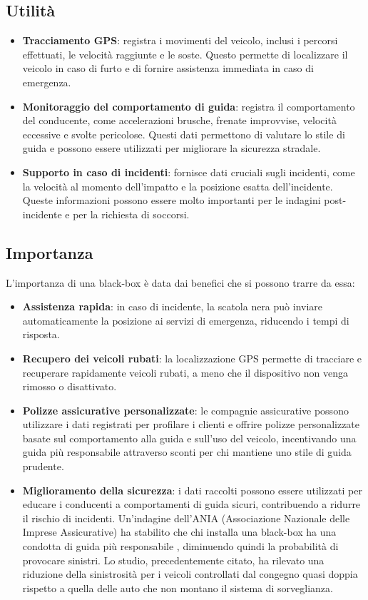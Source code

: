 \documentclass[12pt, a4paper, italian]{report}
\numberwithin{figure}{chapter}
\numberwithin{table}{chapter}
\begin{document}
\subsection{Utilità}
\begin{itemize}
    \item \textbf{Tracciamento GPS}: registra i movimenti del veicolo, inclusi i percorsi effettuati, le velocità raggiunte e le soste. Questo permette di localizzare il veicolo in caso di furto e di fornire assistenza immediata in caso di emergenza.\cite{khin2018real}
    \item \textbf{Monitoraggio del comportamento di guida}: registra il comportamento del conducente, come accelerazioni brusche, frenate improvvise, velocità eccessive e svolte pericolose. Questi dati permettono di valutare lo stile di guida e possono essere utilizzati per migliorare la sicurezza stradale.\cite{hermawan2020acquisition}
    \item \textbf{Supporto in caso di incidenti}: fornisce dati cruciali sugli incidenti, come la velocità al momento dell'impatto e la posizione esatta dell'incidente. Queste informazioni possono essere molto importanti per le indagini post-incidente e per la richiesta di soccorsi. \cite{thompson2010using}
\end{itemize}
\subsection{Importanza}
L'importanza di una black-box è data dai benefici che si possono trarre da essa: 
\begin{itemize}
    \item \textbf{Assistenza rapida}: in caso di incidente, la scatola nera può inviare automaticamente la posizione ai servizi di emergenza, riducendo i tempi di risposta.
    \item \textbf{Recupero dei veicoli rubati}: la localizzazione GPS permette di tracciare e recuperare rapidamente veicoli rubati, a meno che il dispositivo non venga rimosso o disattivato. %
    \item \textbf{Polizze assicurative personalizzate}: le compagnie assicurative possono utilizzare i dati registrati per profilare i clienti e offrire polizze personalizzate basate sul comportamento alla guida e sull'uso del veicolo, incentivando una guida più responsabile attraverso sconti per chi mantiene uno stile di guida prudente.
    \item \textbf{Miglioramento della sicurezza}: i dati raccolti possono essere utilizzati per educare i conducenti a comportamenti di guida sicuri, contribuendo a ridurre il rischio di incidenti. Un'indagine dell'ANIA (Associazione Nazionale delle Imprese Assicurative) ha stabilito che chi installa una black-box ha una condotta di guida più responsabile \cite{diminuzioneIncidenti}, diminuendo quindi la probabilità di provocare sinistri. Lo studio, precedentemente citato, ha rilevato una riduzione della sinistrosità per i veicoli controllati dal congegno quasi doppia rispetto a quella delle auto che non montano il sistema di sorveglianza. %
\end{itemize}
\end{document}
